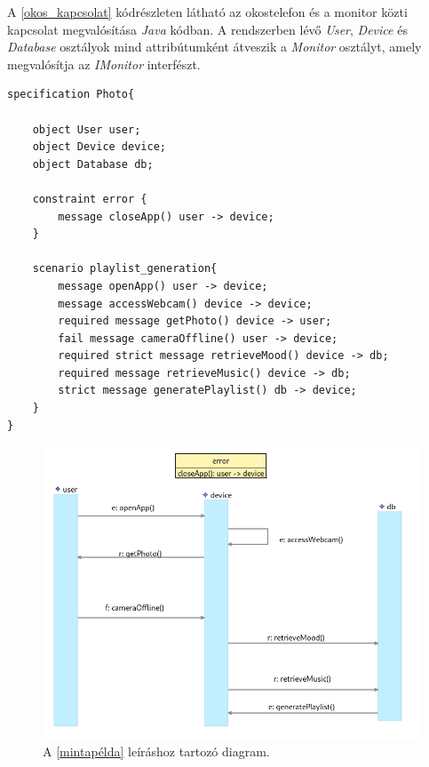 A \ref{okos_kapcsolat} kódrészleten látható az okostelefon és a monitor közti kapcsolat megvalósítása \textit{Java} kódban.
A rendszerben lévő \textit{User}, \textit{Device} és \textit{Database} osztályok mind attribútumként átveszik a \textit{Monitor} osztályt, amely megvalósítja az \textit{IMonitor} interfészt.

\begin{lstlisting}[frame=single, float=ht!, caption={Okostelefon működésére megadott szcenárió követelmény.},captionpos=b, label=mintapélda]
specification Photo{

	object User user;
	object Device device;
	object Database db;

	constraint error {
		message closeApp() user -> device;
	}

	scenario playlist_generation{
		message openApp() user -> device;
		message accessWebcam() device -> device;
		required message getPhoto() device -> user;
		fail message cameraOffline() user -> device;
		required strict message retrieveMood() device -> db;
		required message retrieveMusic() device -> db;
		strict message generatePlaylist() db -> device;
	}
}
\end{lstlisting}

\begin{figure}[!ht]
    \centering
    \includegraphics[width=150mm, keepaspectratio]{figures/monitor_device_visualisation_diagram.png}
    \caption{A \ref{mintapélda} leíráshoz tartozó diagram.}
	\label{monitor_visualisation}
\end{figure}

